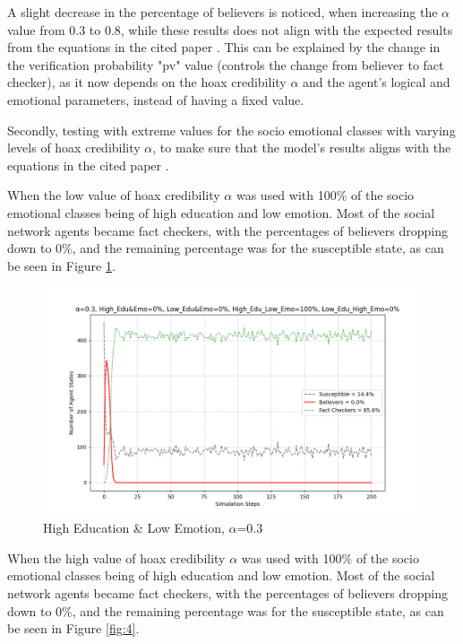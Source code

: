 \documentclass[twocolumn, a4paper, 12pt]{article}
\begin{document}
A slight decrease in the percentage of believers is noticed, when increasing the $\alpha$ value from 0.3 to 0.8, while these results does not align with the expected results from the equations in the cited paper \cite{simulation}. This can be explained by the change in the verification probability "pv" value (controls the change from believer to fact checker), as it now depends on the hoax credibility $\alpha$ and the agent's logical and emotional parameters, instead of having a fixed value.

Secondly, testing with extreme values for the socio emotional classes with varying levels of hoax credibility $\alpha$, to make sure that the model's results aligns with the equations in the cited paper \cite{simulation}.

When the low value of hoax credibility $\alpha$ was used with 100\% of the socio emotional classes being of high education and low emotion. Most of the social network agents became fact checkers, with the percentages of believers dropping down to 0\%, and the remaining percentage was for the susceptible state, as can be seen in Figure \ref{fig:3}.

\begin{figure}[H]
    \centering
    \includegraphics[width=1\linewidth]{0.3_alpha_high.png}
    \caption{High Education \& Low Emotion, $\alpha$=0.3}
    \label{fig:3}
\end{figure}

When the high value of hoax credibility $\alpha$ was used with 100\% of the socio emotional classes being of high education and low emotion. Most of the social network agents became fact checkers, with the percentages of believers dropping down to 0\%, and the remaining percentage was for the susceptible state, as can be seen in Figure \ref{fig:4}.
\end{document}
